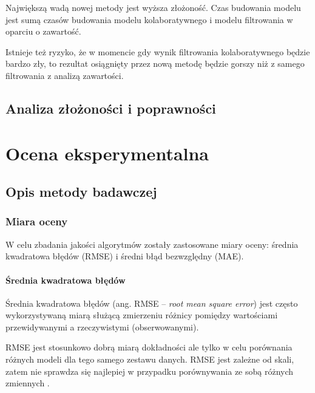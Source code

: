\documentclass[twoside]{iisthesis}
\begin{document}
		 Największą wadą nowej metody jest wyższa złożoność. Czas budowania modelu jest sumą czasów budowania modelu kolaboratywnego i modelu filtrowania w oparciu o zawartość. 
		 
		 Istnieje też ryzyko, że w momencie gdy wynik filtrowania kolaboratywnego będzie bardzo zły, to rezultat osiągnięty przez nową metodę będzie gorszy niż z samego filtrowania z analizą zawartości. 
	 
	 \section{Analiza złożoności i poprawności}
 
 
\chapter{Ocena eksperymentalna}
	\section{Opis metody badawczej}
	
	
		\subsection{Miara oceny}
	
	
		W celu zbadania jakości algorytmów zostały zastosowane miary oceny: średnia kwadratowa błędów (RMSE) i średni błąd bezwzględny (MAE).
		
		\subsubsection{Średnia kwadratowa błędów}
	
		Średnia kwadratowa błędów (ang. RMSE -- \textit{root mean square error}) jest często wykorzystywaną miarą służącą zmierzeniu różnicy pomiędzy wartościami przewidywanymi a rzeczywistymi (obserwowanymi). 
		
		RMSE jest stosunkowo dobrą miarą dokładności ale tylko w celu porównania  różnych modeli dla tego samego zestawu danych. RMSE jest zależne od skali, zatem nie sprawdza się najlepiej w przypadku porównywania ze sobą różnych zmiennych \cite{hyndman2006another}.
		
\end{document}
